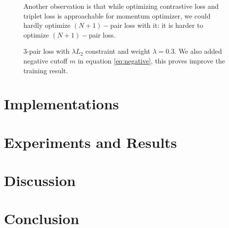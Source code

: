 \documentclass[10pt,twocolumn,letterpaper]{article}
\begin{document}
\begin{figure}[t]
\begin{center}
				\end{center}
   \caption{3-pair loss with $\lambda L_2$ constraint and weight $\lambda=0.3$.  We also added negative cutoff $m$ in equation \ref{eq:negative}, this proves improve the training result.}


   Another observation is that while optimizing contrastive loss and triplet loss is approachable for momentum optimizer, we could hardly optimize $(N+1)-$pair loss with it: it is harder to optimize $(N+1)-$pair loss. 
\end{figure}
	\section{Implementations \label{sec:Impl}}
	
	
	\section{Experiments and Results \label{sec:Res}}
	
	
	\section{Discussion \label{sec:Disc}}
	
	
	\section{Conclusion \label{sec:Conc}}
	
	{\small
		
		
	}
	
\end{document}
